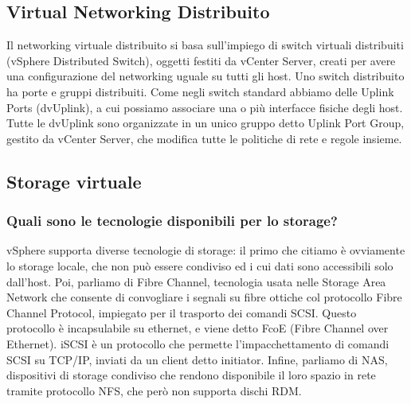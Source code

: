 \documentclass[11pt]{article}
\begin{document}
\subsection{Virtual Networking Distribuito}
Il networking virtuale distribuito si basa sull'impiego di switch virtuali distribuiti (vSphere Distributed Switch), oggetti festiti da vCenter Server, creati per avere una configurazione del networking uguale su tutti gli host. Uno switch distribuito ha porte e gruppi distribuiti. Come negli switch standard abbiamo delle Uplink Ports (dvUplink), a cui possiamo associare una o più interfacce fisiche degli host. Tutte le dvUplink sono organizzate in un unico gruppo detto Uplink Port Group, gestito da vCenter Server, che modifica tutte le politiche di rete e regole insieme. 

\subsection{Storage virtuale}
\subsubsection{Quali sono le tecnologie disponibili per lo storage?}
vSphere supporta diverse tecnologie di storage: il primo che citiamo è ovviamente lo storage locale, che non può essere condiviso ed i cui dati sono accessibili solo dall'host. Poi, parliamo di Fibre Channel, tecnologia usata nelle Storage Area Network che consente di convogliare i segnali su fibre ottiche col protocollo Fibre Channel Protocol, impiegato per il trasporto dei comandi SCSI. Questo protocollo è incapsulabile su ethernet, e viene detto FcoE (Fibre Channel over Ethernet). iSCSI è un protocollo che permette l'impacchettamento di comandi SCSI su TCP/IP, inviati da un client detto initiator. Infine, parliamo di NAS, dispositivi di storage condiviso che rendono disponibile il loro spazio in rete tramite protocollo NFS, che però non supporta dischi RDM. 
\end{document}
